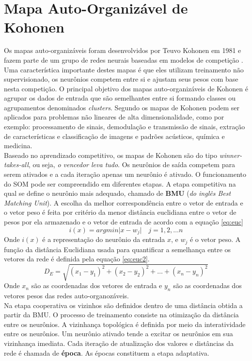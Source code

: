 \section{Mapa Auto-Organizável de Kohonen}
\label{sec:kohonen}
Os mapas auto-organizáveis foram desenvolvidos por Teuvo Kohonen em 1981 e fazem parte de um grupo de redes neurais baseadas em modelos de competição \cite{fia}. Uma característica importante destes mapas é que eles utilizam treinamento não supervisionado, os neurônios competem entre si e ajustam  seus pesos com base nesta competição. O principal objetivo dos mapas auto-organizáveis de Kohonen é agrupar os dados de entrada que são semelhantes entre si formando classes ou agrupamentos denominados \textit{clusters}. Segundo \cite{agua} os mapas de Kohonen podem ser aplicados para problemas não lineares de alta dimensionalidade, como por exemplo: processamento de sinais, demodulação e transmissão de sinais, extração de características e classificação de imagens e padrões acústicos, química e medicina. \\
Baseado no aprendizado competitivo, os mapas de Kohonen são do tipo \textit{winner-takes-all}, ou seja, \textit{o vencedor leva tudo}. Os neurônios de saída competem para serem ativados e a cada iteração apenas um neurônio é ativado. O funcionamento do SOM pode ser compreendido em diferentes etapas. A etapa competitiva na qual se define o neurônio mais adequado, chamado de \textbf{BMU} (\textit{do inglês Best Matching Unit}). A escolha da melhor correspondência entre o vetor de entrada e o vetor peso é feita por critério da menor distância euclidiana entre o vetor de pesos por ela armazenado e o vetor de entrada de acordo com a equação \ref{eq:euc} 
\begin{equation}
\label{eq:euc}
i(x)= argmin \big|x - w_j \big| \quad j = 1,2, \ldots n
\end{equation}
Onde $i(x)$ é a representação do neurônio da entrada $x$, e $w_j$ é o vetor peso. A função da  distância Euclidiana usada para 
quantificar a semelhança entre os vetores da rede é definida pela equação \ref{eq:euc2}.
\begin{equation}
\label{eq:euc2}
D_E = \sqrt{(x_1 - y_1)^2 + (x_2 - y_2)^2 + \ldots + (x_n - y_n)^2}
\end{equation}
Onde $x_n$ são as coordenadas dos vetores de entrada e $y_n$ são as coordenadas dos vetores  pesos  das redes auto-organozáveis.\\

Na etapa cooperativa os vizinhos são definidos dentro de uma distância obtida a partir da BMU. O processo de treinamento consiste na otimização da distância entre os neurônios. A vizinhança topológica é definida por meio da interatividade entre os neurônios. Um neurônio ativado tende a excitar os neurônios em sua vizinhança imediata. Cada iteração de atualização dos valores e distâncias da rede é chamada de \textbf{época}. As épocas constituem a  etapa adaptativa.


